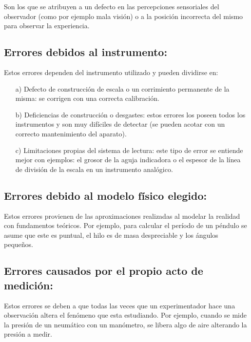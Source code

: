 Son los que se atribuyen a un defecto en las percepciones sensoriales del 
observador (como por ejemplo mala visión) o a la posición incorrecta del mismo para observar la experiencia.

\subsection{Errores  debidos  al  instrumento:} 

Estos errores dependen del instrumento utilizado y pueden dividirse en: 

\begin{itemize}
 \item[a)] Defecto de construcción de escala o un corrimiento permanente de la misma: se corrigen con una correcta calibración.
 
 \item[b)] Deficiencias de construcción o desgastes: estos errores los poseen todos los instrumentos y son muy difíciles de  
detectar (se  pueden  acotar  con  un  correcto mantenimiento del aparato).
 
 \item[c)] Limitaciones propias del sistema de lectura: este tipo de error se entiende mejor con ejemplos: el grosor de la aguja 
 indicadora o el espesor de la línea de división de la escala en un instrumento analógico.
 \end{itemize}


\subsection{Errores debido al modelo físico  elegido:} 

Estos errores provienen  de  las  aproximaciones realizadas al modelar la realidad con fundamentos teóricos. Por ejemplo, para  
calcular el período de un péndulo se asume que este es puntual, el hilo es de masa despreciable y los ángulos pequeños.

\subsection{Errores causados por el propio acto de medición:} 

Estos errores se deben a que todas las veces que un experimentador hace una observación altera el fenómeno que esta estudiando. 
Por ejemplo, cuando se mide la presión de un neumático con un manómetro, se libera algo de aire alterando la presión a medir.  

